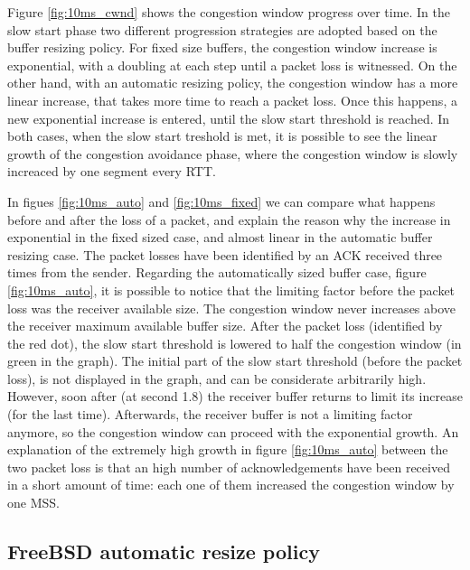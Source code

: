\documentclass[a4paper,10pt]{article}
\begin{document}
Figure \ref{fig:10ms_cwnd} shows the congestion window progress over time. In the slow start phase two different progression strategies are adopted based on the buffer resizing policy. For fixed size buffers, the congestion window increase is exponential, with a doubling at each step until a packet loss is witnessed. On the other hand, with an automatic resizing policy, the congestion window has a more linear increase, that takes more time to reach a packet loss. Once this happens, a new exponential increase is entered, until the slow start threshold is reached.
In both cases, when the slow start treshold is met, it is possible to see the linear growth of the congestion avoidance phase, where the congestion window is slowly increaced by one segment every RTT.

In figues \ref{fig:10ms_auto} and \ref{fig:10ms_fixed} we can compare what happens before and after the loss of a packet, and explain the reason why the increase in exponential in the fixed sized case, and almost linear in the automatic buffer resizing case. 
The packet losses have been identified by an ACK received three times from the sender. 
Regarding the automatically sized buffer case, figure \ref{fig:10ms_auto}, it is possible to notice that the limiting factor before the packet loss was the receiver available size. The congestion window never increases above the receiver maximum available buffer size. After the packet loss (identified by the red dot), the slow start threshold is lowered to half the congestion window (in green in the graph). The initial part of the slow start threshold (before the packet loss), is not displayed in the graph, and can be considerate arbitrarily high. However, soon after (at second 1.8) the receiver buffer returns to limit its increase (for the last time). Afterwards, the receiver buffer is not a limiting factor anymore, so the congestion window can proceed with the exponential growth.
An explanation of the extremely high growth in figure \ref{fig:10ms_auto} between the two packet loss is that an high number of acknowledgements have been received in a short amount of time: each one of them increased the congestion window by one MSS.

\subsection{FreeBSD automatic resize policy}
\end{document}
